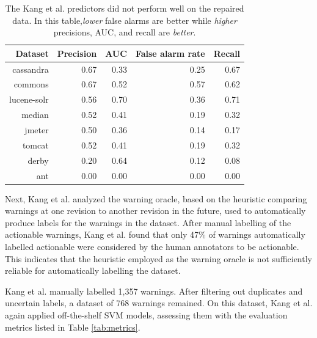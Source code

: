 \begin{table}[!t]
  \centering
  \caption{The Kang et al. predictors did not perform well on the repaired data. In this table,{\em lower} false alarms are better while {\em higher} precisions, AUC, and recall are {\em better}. }
  \label{tab:initial_svm}
  \begin{tabular}{rrrrr}
 
 \toprule
                 
 \textbf{Dataset}           &  \textbf{Precision} & \textbf{AUC} & \textbf{False alarm rate} & \textbf{Recall}          \\
  \midrule 
  cassandra & 0.67 & 0.33 & 0.25 & 0.67 \\
   commons & 0.67 & 0.52 & 0.57 & 0.62 \\
   
  lucene-solr & 0.56 & 0.70  & 0.36 &  0.71\\
  
  median & 0.52 & 0.41 & 0.19 & 0.32 \\
  jmeter & 0.50 & 0.36 & 0.14 & 0.17 \\
  
  tomcat & 0.52 & 0.41 & 0.19 & 0.32 \\
  
  derby & 0.20 & 0.64 & 0.12 & 0.08 \\
 
  ant & 0.00 & 0.00 & 0.00 & 0.00 \\
  \bottomrule
  \end{tabular}
  
\end{table}



Next, Kang et al. analyzed the warning oracle, based on the heuristic comparing warnings at one revision to another revision in the future, used to automatically produce labels for the warnings in the dataset. 
After manual labelling of the actionable warnings, Kang et al. found that only  47\% of warnings automatically labelled actionable were considered by the human annotators to be actionable.
This indicates that the heuristic employed as the warning oracle is not sufficiently reliable for automatically labelling the dataset. 

Kang et al. manually labelled 1,357 warnings. After filtering out duplicates and  uncertain labels, a dataset of 768 warnings remained.
On this dataset, Kang et al. again applied  off-the-shelf SVM models, assessing them with the evaluation metrics listed in Table \ref{tab:metrics}. 




